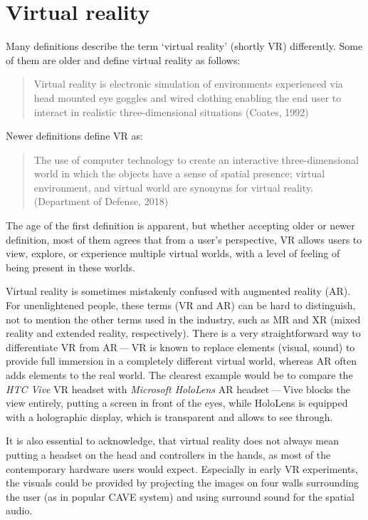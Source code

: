 \chapter{Virtual reality}

Many definitions describe the term `virtual reality' (shortly VR) differently.
Some of them are older and define virtual reality as follows:

\begin{quotation}
Virtual reality is electronic simulation of environments experienced via
head mounted eye goggles and wired clothing enabling the end user to interact
in realistic three-dimensional situations (Coates, 1992) \cite{dvrddt}
\end{quotation}

Newer definitions define VR as:

\begin{quotation}
The use of computer technology to create an interactive three-dimensional
world in which the objects have a sense of spatial presence;
virtual environment, and virtual world are synonyms for virtual reality.
(Department of Defense, 2018) \cite{dvrddt}
\end{quotation}

The age of the first definition is apparent, but whether accepting older or newer
definition, most of them agrees that from a user's perspective, VR allows
users to view, explore, or experience multiple virtual worlds, with a level of 
feeling of being present in these worlds.

Virtual reality is sometimes mistakenly confused with augmented reality (AR).
For unenlightened people, these terms (VR and AR) can be hard to distinguish,
not to mention the other terms used in the industry, such as MR and XR
(mixed reality and extended reality, respectively). There is a very straightforward
way to differentiate VR from AR — VR is known to replace elements
(visual, sound) to provide full immersion in a completely different virtual
world, whereas AR often adds elements to the real world\cite{vrar}.
The clearest example would be to compare the \emph{HTC Vive} VR headset with
\emph{Microsoft HoloLens} AR headset — Vive blocks the view entirely, putting
a screen in front of the eyes, while HoloLens is equipped with a holographic
display, which is transparent and allows to see through.

It is also essential to acknowledge, that virtual reality does not always mean
putting a headset on the head and controllers in the hands, as most of the
contemporary hardware users would expect. Especially in
early VR experiments, the visuals could be provided by projecting the images
on four walls surrounding the user (as in popular CAVE system\cite{cave}) and
using surround sound for the spatial audio.

